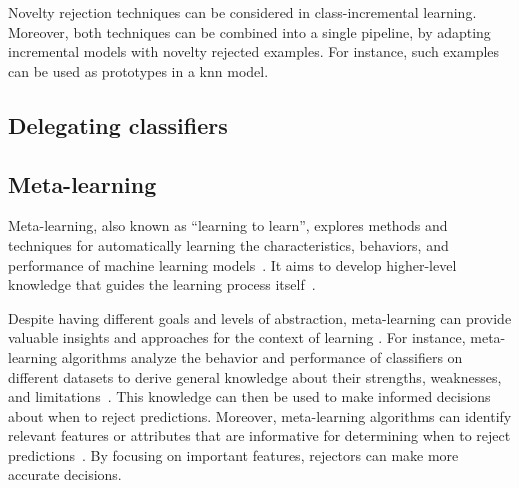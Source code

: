 Novelty rejection techniques can be considered in class-incremental learning. Moreover, both techniques can be combined into a single pipeline, by adapting incremental models with novelty rejected examples. For instance, such examples can be used as prototypes in a \gls{knn} model.

\subsection{Delegating classifiers}



\subsection{Meta-learning}
Meta-learning, also known as ``learning to learn'', explores methods and techniques for automatically learning the characteristics, behaviors, and performance of machine learning models~\citep{Bock1988,Vanschoren2018}. It aims to develop higher-level knowledge that guides the learning process itself~\citep{Brazdil2009,Gridin2022}.

Despite having different goals and levels of abstraction, meta-learning can provide valuable insights and approaches for the context of learning . For instance, meta-learning algorithms analyze the behavior and performance of classifiers on different datasets to derive general knowledge about their strengths, weaknesses, and limitations~\citep{Abbasi2012,Tremmel2022,Cohen2022}. This knowledge can then be used to make informed decisions about when to reject predictions. Moreover, meta-learning algorithms can identify relevant features or attributes that are informative for determining when to reject predictions~\citep{Filchenkov2016,Shen2020a}. By focusing on important features, rejectors can make more accurate decisions.

